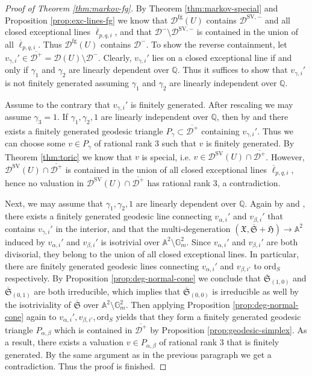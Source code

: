 \documentclass[reqno, 12pt]{amsart}
\theoremstyle{definition}
\newcommand{\bA}{\mathbb{A}}
\newcommand{\bQ}{\mathbb{Q}}
\newcommand{\bG}{\mathbb{G}}
\newcommand{\cD}{\mathcal{D}}
\newcommand{\fS}{\mathfrak{S}}
\newcommand{\ord}{\mathrm{ord}}
\newcommand{\fX}{\mathfrak{X}}
\newcommand{\fH}{\mathfrak{H}}
\newcommand{\SV}{\mathrm{SV}}
\newcommand{\rfg}{\mathrm{fg}}
\newcommand{\oell}{\overline{\ell}}
\numberwithin{equation}{section}
\begin{document}
\begin{proof}[Proof of Theorem \ref{thm:markov-fg}]
By Theorem \ref{thm:markov-special} and Proposition \ref{prop:exc-lines-fg} we know that $\cD^{\rfg}(U)$ contains $\cD^{\SV,-}$ and all closed exceptional lines $\oell_{p,q,i}$, and that $\cD^-\setminus \cD^{\SV,-}$ is contained in the union of all $\oell_{p,q,i}$. Thus $\cD^{\rfg}(U)$ contains $\cD^-$. To show the reverse containment, let $v_{\gamma,i}'\in \overline{\cD^+} = \cD(U)\setminus \cD^-$. Clearly, $v_{\gamma,i}'$ lies on a closed exceptional line if and only if $\gamma_1$ and $\gamma_2$ are linearly dependent over $\bQ$. Thus it suffices to show that $v_{\gamma,i}'$ is not finitely generated assuming $\gamma_1$ and $\gamma_2$ are linearly independent over $\bQ$.

Assume to the contrary that $v_{\gamma,i}'$ is finitely generated. After rescaling we may assume $\gamma_3 = 1$. If $\gamma_1,\gamma_2, 1$ are linearly independent over $\bQ$, then by \cite[Lemma 2.10]{LX18} and \cite[Lemma 4.4]{LXZ22} there exists a finitely generated geodesic triangle $P_\gamma\subset \overline{\cD^+}$ containing $v_{\gamma,i}'$. Thus we can choose some $v\in P_{\gamma}$ of rational rank $3$ such that $v$ is finitely generated. By Theorem \ref{thm:toric} we know that $v$ is special, i.e. $v\in \cD^{\SV}(U)\cap \overline{\cD^+}$. However, $\cD^{\SV}(U)\cap \overline{\cD^+}$ is contained in the union of all closed exceptional lines $\oell_{p,q,i}$, hence no valuation in $\cD^{\SV}(U)\cap \overline{\cD^+}$ has rational rank $3$, a contradiction. 

Next, we may assume that $\gamma_1, \gamma_2,1$ are linearly dependent over $\bQ$. Again by \cite[Lemma 2.10]{LX18} and \cite[Lemma 4.4]{LXZ22}, there exists a finitely generated geodesic line connecting $v_{\alpha,i}'$ and $v_{\beta,i}'$ that contains $v_{\gamma,i}'$ in the interior, and that the multi-degeneration $(\fX, \overline{\fS}+\fH)\to \bA^2$ induced by $v_{\alpha,i}'$ and $v_{\beta,i}'$ is  isotrivial over $\bA^2\setminus \bG_m^2$. Since $v_{\alpha,i}'$ and $v_{\beta,i}'$ are both divisorial, they belong to the union of all closed exceptional lines. In particular, there are finitely generated geodesic lines connecting $v_{\alpha,i}'$ and $v_{\beta,i'}$ to $\ord_S$ respectively. By Proposition \ref{prop:deg-normal-cone} we conclude that $\overline{\fS}_{(1,0)}$ and $\overline{\fS}_{(0,1)}$ are both irreducible, which implies that $\overline{\fS}_{(0,0)}$ is irreducible as well by the isotriviality of $\overline{\fS}$ over $\bA^2\setminus \bG_m^2$. Then applying Proposition \ref{prop:deg-normal-cone} again to $v_{\alpha,i}',v_{\beta,i'},\ord_S$ yields that they form a finitely generated geodesic triangle $P_{\alpha,\beta}$ which is contained in $\overline{\cD^+}$ by Proposition \ref{prop:geodesic-simplex}. As a result, there exists a valuation $v\in P_{\alpha,\beta}$ of rational rank $3$ that is finitely generated. By the same argument as in the previous paragraph we get a contradiction. Thus the proof is finished.
\end{proof}
\end{document}
